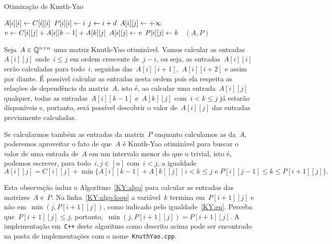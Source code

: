 \newcommand{\KY}{\textsc{KnuthYao}}
\begin{algorithm}[h]
\caption{Otimização de Knuth-Yao}
\label{KY:algo}
\begin{algorithmic}[1]
\Function{\KY}{C, n} 
        \State $A[i][i] \leftarrow C[i][i]$
        \State $P[i][i] \leftarrow i$
    \EndFor
            \State $j \leftarrow i+d$
            \State $A[i][j] \leftarrow +\infty$
             \label{KY:algo:loop}
                \State $v \leftarrow C[i][j] + A[i][k-1] + A[k][j]$
                    \State $A[i][j] \leftarrow v$
                    \State $P[i][j] \leftarrow k$
                \EndIf
            \EndFor
        \EndFor
    \EndFor
    \State \Return~$(A,P)$
\EndFunction
\end{algorithmic}
\end{algorithm}

Seja~$A \in \mathbb{Q}^{n \times n}$ uma matriz Knuth-Yao otimizável. Vamos calcular as entradas~$A[i][j]$ onde~$i \leq j$ em ordem crescente de~$j - i$, ou seja, as entradas~$A[i][i]$ serão calculadas para todo~$i$, seguidas das~$A[i][i+1]$,~$A[i][i+2]$ e assim por diante. É possível calcular as entradas nesta ordem pois ela respeita as relações de dependência da matriz~$A$, isto é, ao calcular uma entrada~$A[i][j]$ qualquer, todas as entradas~$A[i][k-1]$ e~$A[k][j]$ com~$i < k \leq j$ já estarão disponíveis e, portanto, será possível descobrir o valor de~$A[i][j]$ das entradas previamente calculadas.

Se calcularmos também as entradas da matriz~$P$ enquanto calculamos as da~$A$, poderemos aproveitar o fato de que~$A$ é Knuth-Yao otimizável para buscar o valor de uma entrada de~$A$ em um intervalo menor do que o trivial, isto é, podemos escrever, para todo~$i,j \in [n]$ com~$i < j$, a igualdade
\begin{equation} \label{KY:eq}
A[i][j] = C[i][j] + \min\{A[i][k-1] + A[k][j] \mid i < k \leq j \text{ e } P[i][j-1] \leq k \leq P[i+1][j]\} \text{.}
\end{equation}

Esta observação induz o Algoritmo~\ref{KY:algo} para calcular as entradas das matrizes~$A$ e~$P$. Na linha~\ref{KY:algo:loop} a variável~$k$ termina em~$P[i+1][j]$ e não em~${ \min(j,P[i+1][j]) }$, como indicado pelo igualdade~\eqref{KY:eq}. Perceba que~${ P[i+1][j] \leq j }$, portanto,~${ \min(j,P[i+1][j]) = P[i+1][j] }$. A implementação em~\texttt{C++} deste algoritmo como descrito acima pode ser encontrado na pasta de implementações com o nome~\texttt{KnuthYao.cpp}.

